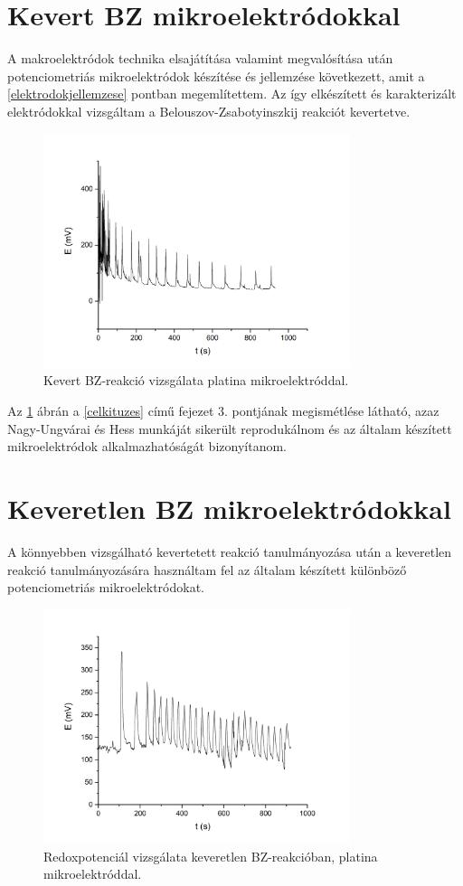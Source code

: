 \section{Kevert BZ mikroelektródokkal}
A makroelektródok technika elsajátítása valamint megvalósítása után potenciometriás mikroelektródok készítése és jellemzése következett, amit a \ref{elektrodokjellemzese} pontban megemlítettem. Az így elkészített és karakterizált elektródokkal vizsgáltam a Belouszov-Zsabotyinszkij reakciót kevertetve.
\begin{figure}[h]
\centering
\includegraphics[width=0.8\textwidth]{img/platina_kevert.jpg}
\caption{Kevert BZ-reakció vizsgálata  platina mikroelektróddal.}
\label{fig:platina_kevert}
\end{figure}

Az \ref{fig:platina_kevert} ábrán a \ref{celkituzes} című fejezet 3. pontjának megismétlése látható, azaz Nagy-Ungvárai és Hess munkáját sikerült reprodukálnom és az általam készített mikroelektródok alkalmazhatóságát bizonyítanom.

\section{Keveretlen BZ mikroelektródokkal}
A könnyebben vizsgálható kevertetett reakció tanulmányozása után a keveretlen reakció tanulmányozására használtam fel az általam készített különböző potenciometriás mikroelektródokat.
\begin{figure}[h]
\centering
\includegraphics[width=0.8\textwidth]{img/platina_keveretlen.jpg}
\caption{Redoxpotenciál vizsgálata keveretlen BZ-reakcióban, platina mikroelektróddal.}
\label{fig:platina_keveretlen}
\end{figure}

